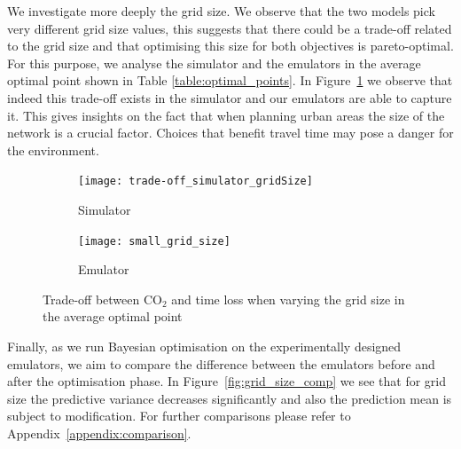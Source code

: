 We investigate more deeply the grid size. We observe that the two models pick very different grid size values, this suggests that there could be a trade-off related to the grid size and that optimising this size for both objectives is pareto-optimal. For this purpose, we analyse the simulator and the emulators in the average optimal point shown in Table \ref{table:optimal_points}.
In Figure~\ref{fig:trade_off} we observe that indeed this trade-off exists in the simulator and our emulators are able to capture it. This gives insights on the fact that when planning urban areas the size of the network is a crucial factor. Choices that benefit travel time may pose a danger for the environment.

\begin{figure}[b!]
\centering
\begin{subfigure}{0.5\textwidth}
  \centering
  \texttt{[image: trade-off\_simulator\_gridSize]}
  \caption{Simulator}
\end{subfigure}%
\begin{subfigure}{0.5\textwidth}
  \centering
  \texttt{[image: small\_grid\_size]}
  \caption{Emulator}
\end{subfigure}
\caption{Trade-off between CO$_2$ and time loss when varying the grid size in the average optimal point}
\label{fig:trade_off}
\end{figure}

Finally, as we run Bayesian optimisation on the experimentally designed emulators, we aim to compare the difference between the emulators before and after the optimisation phase. In Figure~\ref{fig:grid_size_comp} we see that for grid size the predictive variance decreases significantly and also the prediction mean is subject to modification. For further comparisons please refer to Appendix~\ref{appendix:comparison}.

